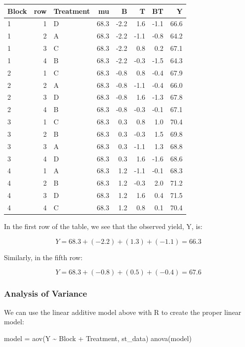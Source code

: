 \documentclass[
]{book}
\newenvironment{Shaded}{\begin{snugshade}}{\end{snugshade}}
\newcommand{\FunctionTok}[1]{\textcolor[rgb]{0.00,0.00,0.00}{#1}}
\newcommand{\NormalTok}[1]{#1}
\newcommand{\OtherTok}[1]{\textcolor[rgb]{0.56,0.35,0.01}{#1}}
\newcommand{\SpecialCharTok}[1]{\textcolor[rgb]{0.00,0.00,0.00}{#1}}
\begin{document}
\begin{tabular}{l|r|l|r|r|r|r|r}
\hline
Block & row & Treatment & mu & B & T & BT & Y\\
\hline
1 & 1 & D & 68.3 & -2.2 & 1.6 & -1.1 & 66.6\\
\hline
1 & 2 & A & 68.3 & -2.2 & -1.1 & -0.8 & 64.2\\
\hline
1 & 3 & C & 68.3 & -2.2 & 0.8 & 0.2 & 67.1\\
\hline
1 & 4 & B & 68.3 & -2.2 & -0.3 & -1.5 & 64.3\\
\hline
2 & 1 & C & 68.3 & -0.8 & 0.8 & -0.4 & 67.9\\
\hline
2 & 2 & A & 68.3 & -0.8 & -1.1 & -0.4 & 66.0\\
\hline
2 & 3 & D & 68.3 & -0.8 & 1.6 & -1.3 & 67.8\\
\hline
2 & 4 & B & 68.3 & -0.8 & -0.3 & -0.1 & 67.1\\
\hline
3 & 1 & C & 68.3 & 0.3 & 0.8 & 1.0 & 70.4\\
\hline
3 & 2 & B & 68.3 & 0.3 & -0.3 & 1.5 & 69.8\\
\hline
3 & 3 & A & 68.3 & 0.3 & -1.1 & 1.3 & 68.8\\
\hline
3 & 4 & D & 68.3 & 0.3 & 1.6 & -1.6 & 68.6\\
\hline
4 & 1 & A & 68.3 & 1.2 & -1.1 & -0.1 & 68.3\\
\hline
4 & 2 & B & 68.3 & 1.2 & -0.3 & 2.0 & 71.2\\
\hline
4 & 3 & D & 68.3 & 1.2 & 1.6 & 0.4 & 71.5\\
\hline
4 & 4 & C & 68.3 & 1.2 & 0.8 & 0.1 & 70.4\\
\hline
\end{tabular}

In the first row of the table, we see that the observed yield, Y, is:

\[ Y = 68.3 + (-2.2) + (1.3) + (-1.1) = 66.3 \]

Similarly, in the fifth row:

\[ Y = 68.3 + (-0.8) + (0.5) + (-0.4) = 67.6 \]

\hypertarget{analysis-of-variance-1}{%
\subsubsection{Analysis of Variance}\label{analysis-of-variance-1}}

We can use the linear additive model above with R to create the proper linear model:

\begin{Shaded}
\begin{Highlighting}[]
\NormalTok{model }\OtherTok{=} \FunctionTok{aov}\NormalTok{(Y }\SpecialCharTok{\textasciitilde{}}\NormalTok{ Block }\SpecialCharTok{+}\NormalTok{ Treatment, st\_data)}
\FunctionTok{anova}\NormalTok{(model)}
\end{Highlighting}
\end{Shaded}
\end{document}
